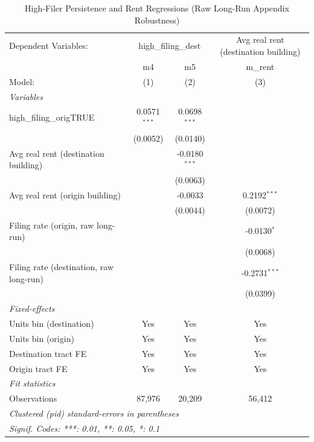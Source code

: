 \begin{table}[htbp]
   \caption{\label{tab:evict_persist_hf_rent_raw} High-Filer Persistence and Rent Regressions (Raw Long-Run Appendix Robustness)}
   \centering
   \begin{tabular}{lccc}
      \tabularnewline \midrule \midrule
      Dependent Variables: & \multicolumn{2}{c}{high\_filing\_dest} & Avg real rent (destination building)\\
                                              & m4             & m5              & m\_rent \\    
      Model:                                  & (1)            & (2)             & (3)\\  
      \midrule
      \emph{Variables}\\
      high\_filing\_origTRUE                  & 0.0571$^{***}$ & 0.0698$^{***}$  &   \\   
                                              & (0.0052)       & (0.0140)        &   \\   
      Avg real rent (destination building)    &                & -0.0180$^{***}$ &   \\   
                                              &                & (0.0063)        &   \\   
      Avg real rent (origin building)         &                & -0.0033         & 0.2192$^{***}$\\   
                                              &                & (0.0044)        & (0.0072)\\   
      Filing rate (origin, raw long-run)      &                &                 & -0.0130$^{*}$\\   
                                              &                &                 & (0.0068)\\   
      Filing rate (destination, raw long-run) &                &                 & -0.2731$^{***}$\\   
                                              &                &                 & (0.0399)\\   
      \midrule
      \emph{Fixed-effects}\\
      Units bin (destination)                 & Yes            & Yes             & Yes\\  
      Units bin (origin)                      & Yes            & Yes             & Yes\\  
      Destination tract FE                    & Yes            & Yes             & Yes\\  
      Origin tract FE                         & Yes            & Yes             & Yes\\  
      \midrule
      \emph{Fit statistics}\\
      Observations                            & 87,976         & 20,209          & 56,412\\  
      \midrule \midrule
      \multicolumn{4}{l}{\emph{Clustered (pid) standard-errors in parentheses}}\\
      \multicolumn{4}{l}{\emph{Signif. Codes: ***: 0.01, **: 0.05, *: 0.1}}\\
   \end{tabular}
\end{table}
